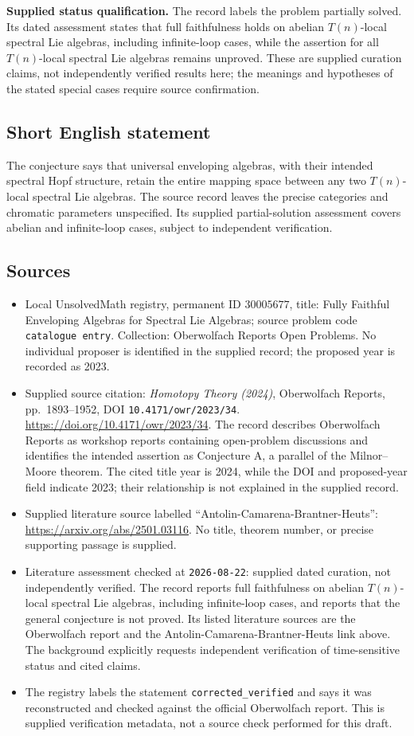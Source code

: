 \documentclass[11pt]{article}
\begin{document}
\textbf{Supplied status qualification.} The record labels the problem partially solved. Its dated assessment states that full faithfulness holds on abelian \(T(n)\)-local spectral Lie algebras, including infinite-loop cases, while the assertion for all \(T(n)\)-local spectral Lie algebras remains unproved. These are supplied curation claims, not independently verified results here; the meanings and hypotheses of the stated special cases require source confirmation.
\subsection{Short English statement}
The conjecture says that universal enveloping algebras, with their intended spectral Hopf structure, retain the entire mapping space between any two \(T(n)\)-local spectral Lie algebras. The source record leaves the precise categories and chromatic parameters unspecified. Its supplied partial-solution assessment covers abelian and infinite-loop cases, subject to independent verification.
\subsection{Sources}
\begin{itemize}
\item Local UnsolvedMath registry, permanent ID \(30005677\), title: Fully Faithful Enveloping Algebras for Spectral Lie Algebras; source problem code \texttt{catalogue entry}. Collection: Oberwolfach Reports Open Problems. No individual proposer is identified in the supplied record; the proposed year is recorded as 2023.
\item Supplied source citation: \emph{Homotopy Theory (2024)}, Oberwolfach Reports, pp.\ 1893--1952, DOI \texttt{10.4171/owr/2023/34}. \url{https://doi.org/10.4171/owr/2023/34}. The record describes Oberwolfach Reports as workshop reports containing open-problem discussions and identifies the intended assertion as Conjecture A, a parallel of the Milnor--Moore theorem. The cited title year is 2024, while the DOI and proposed-year field indicate 2023; their relationship is not explained in the supplied record.
\item Supplied literature source labelled ``Antolin-Camarena-Brantner-Heuts'': \url{https://arxiv.org/abs/2501.03116}. No title, theorem number, or precise supporting passage is supplied.
\item Literature assessment checked at \texttt{2026-08-22}: supplied dated curation, not independently verified. The record reports full faithfulness on abelian \(T(n)\)-local spectral Lie algebras, including infinite-loop cases, and reports that the general conjecture is not proved. Its listed literature sources are the Oberwolfach report and the Antolin-Camarena-Brantner-Heuts link above. The background explicitly requests independent verification of time-sensitive status and cited claims.
\item The registry labels the statement \texttt{corrected\_verified} and says it was reconstructed and checked against the official Oberwolfach report. This is supplied verification metadata, not a source check performed for this draft.
\end{itemize}
\end{document}
